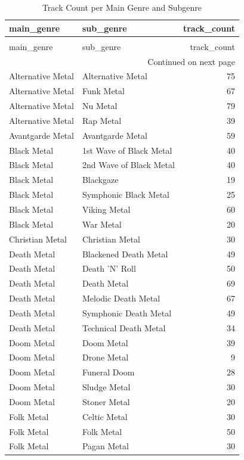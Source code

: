 \begin{longtable}{llr}
\caption{Track Count per Main Genre and Subgenre} \label{table:genre_subgenre} \\
\toprule
main_genre & sub_genre & track_count \\
\midrule
\endfirsthead
\caption[]{Track Count per Main Genre and Subgenre} \\
\toprule
main_genre & sub_genre & track_count \\
\midrule
\endhead
\midrule
\multicolumn{3}{r}{Continued on next page} \\
\midrule
\endfoot
\bottomrule
\endlastfoot
Alternative Metal & Alternative Metal & 75 \\
Alternative Metal & Funk Metal & 67 \\
Alternative Metal & Nu Metal & 79 \\
Alternative Metal & Rap Metal & 39 \\
Avantgarde Metal & Avantgarde Metal & 59 \\
Black Metal & 1st Wave of Black Metal & 40 \\
Black Metal & 2nd Wave of Black Metal & 40 \\
Black Metal & Blackgaze & 19 \\
Black Metal & Symphonic Black Metal & 25 \\
Black Metal & Viking Metal & 60 \\
Black Metal & War Metal & 20 \\
Christian Metal & Christian Metal & 30 \\
Death Metal & Blackened Death Metal & 49 \\
Death Metal & Death 'N' Roll & 50 \\
Death Metal & Death Metal & 69 \\
Death Metal & Melodic Death Metal & 67 \\
Death Metal & Symphonic Death Metal & 49 \\
Death Metal & Technical Death Metal & 34 \\
Doom Metal & Doom Metal & 39 \\
Doom Metal & Drone Metal & 9 \\
Doom Metal & Funeral Doom & 28 \\
Doom Metal & Sludge Metal & 30 \\
Doom Metal & Stoner Metal & 20 \\
Folk Metal & Celtic Metal & 30 \\
Folk Metal & Folk Metal & 50 \\
Folk Metal & Pagan Metal & 30 \\

\end{longtable}

